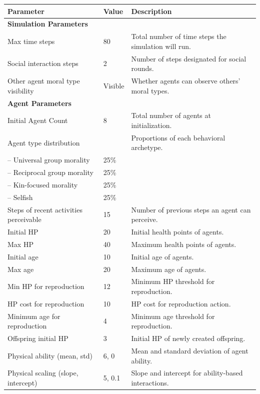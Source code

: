 \begin{table}[htbp]
\centering
\small
\begin{tabular}{lp{1.2cm}p{6.5cm}}
\hline
\textbf{Parameter} & \textbf{Value} & \textbf{Description} \\
\hline
\multicolumn{3}{l}{\textbf{Simulation Parameters}} \\
\hline
Max time steps & 80 & Total number of time steps the simulation will run. \\
Social interaction steps & 2 & Number of steps designated for social rounds. \\
Other agent moral type visibility & Visible & Whether agents can observe others' moral types. \\

\hline
\multicolumn{3}{l}{\textbf{Agent Parameters}} \\
\hline
Initial Agent Count & 8 & Total number of agents at initialization. \\
Agent type distribution &  & Proportions of each behavioral archetype. \\
-- Universal group morality & 25\% &  \\
-- Reciprocal group morality & 25\% &  \\
-- Kin-focused morality & 25\% &  \\
-- Selfish & 25\% &  \\
Steps of recent activities perceivable & 15 & Number of previous steps an agent can perceive. \\
Initial HP & 20 & Initial health points of agents. \\
Max HP & 40 & Maximum health points of agents. \\
Initial age & 10 & Initial age of agents. \\
Max age & 20 & Maximum age of agents. \\
Min HP for reproduction & 12 & Minimum HP threshold for reproduction. \\
HP cost for reproduction & 10 & HP cost for reproduction action. \\
Minimum age for reproduction & 4 & Minimum age threshold for reproduction. \\
Offspring initial HP & 3 & Initial HP of newly created offspring. \\
Physical ability (mean, std) & 6, 0 & Mean and standard deviation of agent ability. \\
Physical scaling (slope, intercept) & 5, 0.1 & Slope and intercept for ability-based interactions. \\

\end{tabular}
\end{table}
